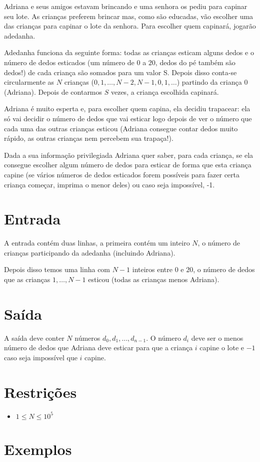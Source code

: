 Adriana e seus amigos estavam brincando e uma senhora os pediu para capinar seu lote. As crianças preferem brincar mas, como são educadas, vão escolher uma das crianças para capinar o lote da senhora. Para escolher quem capinará, jogarão adedanha.

Adedanha funciona da seguinte forma: todas as crianças esticam alguns dedos e o número de dedos esticados (um número de $0$ a $20$, dedos do pé também são dedos!) de cada criança são somados para um valor S. Depois disso conta-se circularmente as $N$ crianças ($0, 1, \ldots, N - 2, N - 1, 0, 1, \ldots$) partindo da criança $0$ (Adriana). Depois de contarmos $S$ vezes, a criança escolhida capinará.

Adriana é muito esperta e, para escolher quem capina, ela decidiu trapacear: ela só vai decidir o número de dedos que vai esticar logo depois de ver o número que cada uma das outras crianças esticou (Adriana consegue contar dedos muito rápido, as outras crianças nem percebem sua trapaça!).

Dada a sua informação privilegiada Adriana quer saber, para cada criança, se ela consegue escolher algum número de dedos para esticar de forma que esta criança capine (se vários números de dedos esticados forem possíveis para fazer certa criança começar, imprima o menor deles) ou caso seja impossível, -1.

\section*{Entrada}

A entrada contém duas linhas, a primeira contém um inteiro $N$, o número de crianças participando da adedanha (incluindo Adriana).

Depois disso temos uma linha com $N - 1$ inteiros entre $0$ e $20$, o número de dedos que as crianças $1,\ldots,N - 1$ esticou (todas as crianças menos Adriana). 
\section*{Saída}

A saída deve conter $N$ números $d_0, d_1, \ldots, d_{n - 1}$. O número $d_i$ deve ser o menos número de dedos que Adriana deve esticar para que a criança $i$ capine o lote e $-1$ caso seja impossível que $i$ capine.

\section*{Restrições}

\begin{itemize}
\item $1 \leq N \leq 10^5$
\end{itemize}

\section*{Exemplos}